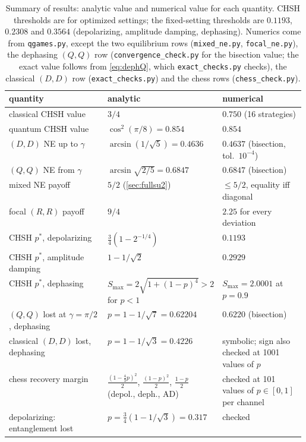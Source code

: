 \documentclass[11pt,a4paper]{article}
\begin{document}
\begin{table}[tbp]\centering\small
\caption{Summary of results: analytic value and numerical value for each quantity. CHSH thresholds are for optimized settings; the fixed-setting thresholds are $0.1193$, $0.2308$ and $0.3564$ (depolarizing, amplitude damping, dephasing). Numerics come from \texttt{qgames.py}, except the two equilibrium rows (\texttt{mixed\_ne.py}, \texttt{focal\_ne.py}), the dephasing $(Q,Q)$ row (\texttt{convergence\_check.py} for the bisection value; the exact value follows from \cref{eq:dephQ}, which \texttt{exact\_checks.py} checks), the classical $(D,D)$ row (\texttt{exact\_checks.py}) and the chess rows (\texttt{chess\_check.py}).}
\label{tab:summary}
\begin{tabular}{lp{0.29\linewidth}p{0.29\linewidth}}
\toprule
quantity & analytic & numerical\\
\midrule
classical CHSH value & $3/4$ & $0.750$ (16 strategies)\\
quantum CHSH value & $\cos^2(\pi/8)=0.854$ & $0.854$\\
$(D,D)$ NE up to $\gamma$ & $\arcsin(1/\sqrt5)=0.4636$ & $0.4637$ (bisection, tol.\ $10^{-4}$)\\
$(Q,Q)$ NE from $\gamma$ & $\arcsin\sqrt{2/5}=0.6847$ & $0.6847$ (bisection)\\
mixed NE payoff & $5/2$ (\cref{sec:fullsu2}) & $\le5/2$, equality iff diagonal\\
focal $(R,R)$ payoff & $9/4$ & $2.25$ for every deviation\\
CHSH $p^*$, depolarizing & $\tfrac34(1-2^{-1/4})$ & $0.1193$\\
CHSH $p^*$, amplitude damping & $1-1/\sqrt2$ & $0.2929$\\
CHSH $p^*$, dephasing & $S_{\max}=2\sqrt{1+(1-p)^4}>2$ for $p<1$ & $S_{\max}=2.0001$ at $p=0.9$\\
$(Q,Q)$ lost at $\gamma=\pi/2$, dephasing & $p=1-1/\sqrt7=0.62204$ & $0.6220$ (bisection)\\
classical $(D,D)$ lost, dephasing & $p=1-1/\sqrt3=0.4226$ & symbolic; sign also checked at 1001 values of $p$\\
chess recovery margin & $\frac{(1-\frac43p)^2}2$, $\frac{(1-p)^2}2$, $\frac{1-p}2$ (depol., deph., AD) & checked at 101 values of $p\in[0,1]$ per channel\\
depolarizing: entanglement lost & $p=\frac34(1-1/\sqrt3)=0.317$ & checked\\
\bottomrule
\end{tabular}
\end{table}
\end{document}
